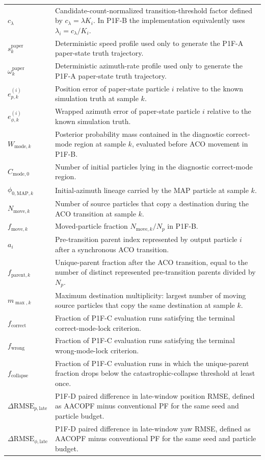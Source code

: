 \begin{longtable}{p{}p{}}
$c_\lambda$ & Candidate-count-normalized transition-threshold factor defined by $c_\lambda=\lambda K_i$. In P1F-B the implementation equivalently uses $\lambda_i=c_\lambda/K_i$.\\
$s_k^{\mathrm{paper}}$ & Deterministic speed profile used only to generate the P1F-A paper-state truth trajectory.\\
$\omega_k^{\mathrm{paper}}$ & Deterministic azimuth-rate profile used only to generate the P1F-A paper-state truth trajectory.\\
$e_{p,k}^{(i)}$ & Position error of paper-state particle $i$ relative to the known simulation truth at sample $k$.\\
$e_{\phi,k}^{(i)}$ & Wrapped azimuth error of paper-state particle $i$ relative to the known simulation truth.\\
$W_{\mathrm{mode},k}$ & Posterior probability mass contained in the diagnostic correct-mode region at sample $k$, evaluated before ACO movement in P1F-B.\\
$C_{\mathrm{mode},0}$ & Number of initial particles lying in the diagnostic correct-mode region.\\
$\phi_{0,\mathrm{MAP},k}$ & Initial-azimuth lineage carried by the MAP particle at sample $k$.\\
$N_{\mathrm{move},k}$ & Number of source particles that copy a destination during the ACO transition at sample $k$.\\
$f_{\mathrm{move},k}$ & Moved-particle fraction $N_{\mathrm{move},k}/N_p$ in P1F-B.\\
$a_i$ & Pre-transition parent index represented by output particle $i$ after a synchronous ACO transition.\\
$f_{\mathrm{parent},k}$ & Unique-parent fraction after the ACO transition, equal to the number of distinct represented pre-transition parents divided by $N_p$.\\
$m_{\max,k}$ & Maximum destination multiplicity: largest number of moving source particles that copy the same destination at sample $k$.\\
$f_{\mathrm{correct}}$ & Fraction of P1F-C evaluation runs satisfying the terminal correct-mode-lock criterion.\\
$f_{\mathrm{wrong}}$ & Fraction of P1F-C evaluation runs satisfying the terminal wrong-mode-lock criterion.\\
$f_{\mathrm{collapse}}$ & Fraction of P1F-C evaluation runs in which the unique-parent fraction drops below the catastrophic-collapse threshold at least once.\\
$\Delta\mathrm{RMSE}_{p,\mathrm{late}}$ & P1F-D paired difference in late-window position RMSE, defined as AACOPF minus conventional PF for the same seed and particle budget.\\
$\Delta\mathrm{RMSE}_{\phi,\mathrm{late}}$ & P1F-D paired difference in late-window yaw RMSE, defined as AACOPF minus conventional PF for the same seed and particle budget.\\
\bottomrule
\end{longtable}
